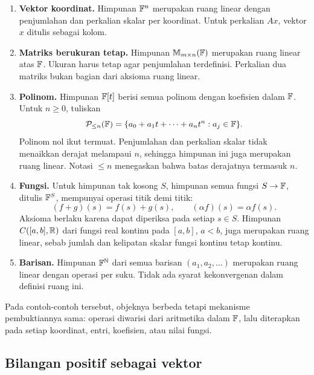 \begin{enumerate}[label=(\alph*)]
    \item \textbf{Vektor koordinat.} Himpunan $\mathbb{F}^n$ merupakan
          ruang linear dengan penjumlahan dan perkalian skalar per
          koordinat. Untuk perkalian $Ax$, vektor $x$ ditulis sebagai kolom.
    \item \textbf{Matriks berukuran tetap.} Himpunan
          $\mathbb{M}_{m\times n}(\mathbb{F})$ merupakan ruang linear atas $\mathbb{F}$.
          Ukuran harus tetap agar penjumlahan terdefinisi.
          Perkalian dua matriks bukan bagian dari aksioma ruang linear.
    \item \textbf{Polinom.} Himpunan $\mathbb{F}[t]$ berisi semua polinom
          dengan koefisien dalam $\mathbb{F}$. Untuk $n\ge0$, tuliskan
          \[
              \mathcal P_{\le n}(\mathbb{F})
              =\{a_0+a_1t+\cdots+a_nt^n:a_j\in\mathbb{F}\}.
          \]
          Polinom nol ikut termuat. Penjumlahan dan perkalian skalar
          tidak menaikkan derajat melampaui $n$, sehingga himpunan
          ini juga merupakan ruang linear. Notasi $\le n$ menegaskan
          bahwa batas derajatnya termasuk $n$.
    \item \textbf{Fungsi.} Untuk himpunan tak kosong $S$,
          himpunan semua fungsi $S\to\mathbb{F}$, ditulis $\mathbb{F}^S$,
          mempunyai operasi titik demi titik:
          \[
              (f+g)(s)=f(s)+g(s),\qquad
              (\alpha f)(s)=\alpha f(s).
          \]
          Aksioma berlaku karena dapat diperiksa pada setiap $s\in S$.
          Himpunan $C([a,b],\mathbb{R})$ dari fungsi real kontinu pada
          $[a,b]$, $a<b$, juga merupakan ruang linear, sebab jumlah
          dan kelipatan skalar fungsi kontinu tetap kontinu.
    \item \textbf{Barisan.} Himpunan $\mathbb{F}^{\mathbb N}$ dari semua
          barisan $(a_1,a_2,\ldots)$ merupakan ruang linear dengan
          operasi per suku. Tidak ada syarat kekonvergenan dalam
          definisi ruang ini.
\end{enumerate}

Pada contoh-contoh tersebut, objeknya berbeda tetapi mekanisme
pembuktiannya sama: operasi diwarisi dari aritmetika dalam $\mathbb{F}$,
lalu diterapkan pada setiap koordinat, entri, koefisien, atau nilai fungsi.

\subsection{Bilangan positif sebagai vektor}

